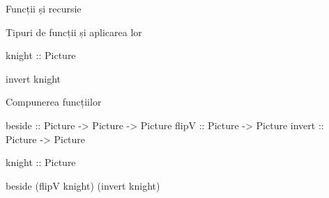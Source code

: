 \documentclass[handout,xcolor=pdftex,romanian,colorlinks]{beamer}
\begin{document}
\begin{section}{Funcții și recursie}
\begin{frame}[fragile]{Tipuri de funcții și aplicarea lor}
\begin{asciihs}
knight :: Picture

invert knight
\end{asciihs}
\vfill
{}
\end{frame}

\begin{frame}[fragile]{Compunerea funcțiilor}
\begin{asciihs}
beside :: Picture -> Picture -> Picture
flipV :: Picture -> Picture
invert :: Picture -> Picture

knight :: Picture

beside (flipV knight) (invert knight)
\end{asciihs}


\end{frame}
\end{section}
\end{document}
